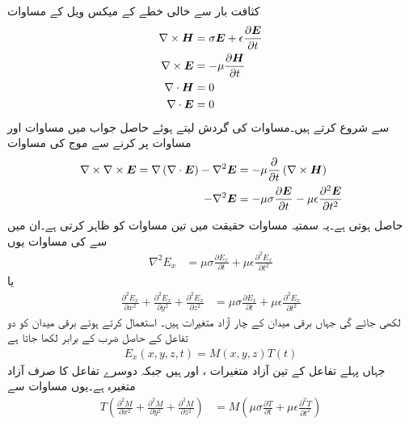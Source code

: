 کثافت بار سے خالی  خطے کے میکس ویل کے مساوات
\begin{align}
\nabla \times {\ensuremath{{\boldsymbol{H}}}}&=\sigma {\ensuremath{{\boldsymbol{E}}}}+\epsilon \frac{\partial {\ensuremath{{\boldsymbol{E}}}}}{\partial t} \label{مساوات_مویج_مستطیلی_گمکیا_الف}\\
\nabla \times {\ensuremath{{\boldsymbol{E}}}}&=-\mu \frac{\partial {\ensuremath{{\boldsymbol{H}}}}}{\partial t} \label{مساوات_مویج_مستطیلی_گمکیا_ب}\\
\nabla \cdot {\ensuremath{{\boldsymbol{H}}}}&=0 \label{مساوات_مویج_مستطیلی_گمکیا_پ}\\
\nabla \cdot {\ensuremath{{\boldsymbol{E}}}}&=0 \label{مساوات_مویج_مستطیلی_گمکیا_ت}
\end{align}
 سے شروع کرتے ہیں۔مساوات  کی گردش لیتے ہوئے حاصل جواب میں مساوات  اور مساوات  پر کرنے سے موج کی مساوات 
\begin{align*}
\nabla \times \nabla \times {\ensuremath{{\boldsymbol{E}}}}=\nabla \left(\nabla \cdot {\ensuremath{{\boldsymbol{E}}}}\right)-\nabla^2 {{\boldsymbol{E}}}&=-\mu \frac{\partial }{\partial t}\left(\nabla \times {\ensuremath{{\boldsymbol{H}}}}\right)\\
-\nabla^2 {{\boldsymbol{E}}}&=-\mu \sigma \frac{\partial {\ensuremath{{\boldsymbol{E}}}}}{\partial t}-\mu\epsilon \frac{\partial^2 {{\boldsymbol{E}}}}{\partial t^2}
\end{align*}
حاصل ہوتی ہے۔یہ سمتیہ  مساوات حقیقت میں تین مساوات کو ظاہر کرتی ہے۔ان میں سے   کی مساوات یوں
\begin{align*}
\nabla^2 E_x&=\mu \sigma \frac{\partial E_x}{\partial t}+\mu\epsilon \frac{\partial^2 E_x}{\partial t^2}
\end{align*}
یا
\begin{align}\label{مساوات_مویج_مستطیلی_گمکیا_ٹ}
\frac{\partial^2 E_x}{\partial x^2}+\frac{\partial^2 E_x}{\partial y^2}+\frac{\partial^2 E_x}{\partial z^2}&=\mu \sigma \frac{\partial E_x}{\partial t}+\mu\epsilon \frac{\partial^2 E_x}{\partial t^2}
\end{align}
لکھی جائے گی جہاں برقی میدان  کے چار آزاد متغیرات ہیں۔ استعمال کرتے ہوئے  برقی میدان کو دو تفاعل کے حاصل ضرب کے برابر لکھا جاتا ہے
\begin{align}\label{مساوات_مویج_مستطیلی_گمکیا_ث}
E_x(x,y,z,t)=M(x,y,z) T(t)
\end{align} 
جہاں پہلے تفاعل  کے تین آزاد متغیرات ،  اور  ہیں جبکہ دوسرے تفاعل  کا صرف  آزاد متغیرہ ہے۔یوں مساوات  سے
\begin{align*}
T\left(\frac{\partial^2 M}{\partial x^2}+\frac{\partial^2 M}{\partial y^2}+\frac{\partial^2 M}{\partial z^2}\right)&=M\left(\mu \sigma \frac{\partial T}{\partial t}+\mu\epsilon \frac{\partial^2 T}{\partial t^2}\right)
\end{align*}
